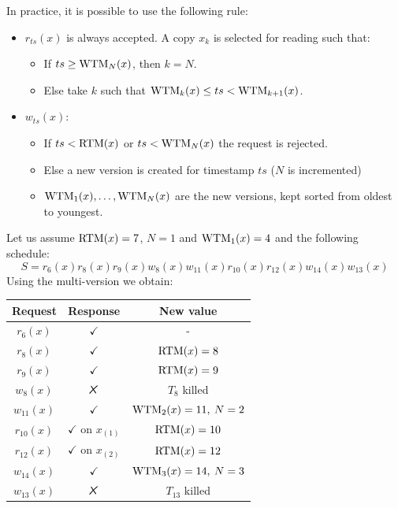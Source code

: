 \documentclass[12pt, a4paper]{report}
\newtheorem[style=M,bodystyle=\normalfont]{theorem}{Theorem}
\newtheorem[style=M,bodystyle=\normalfont]{corollary}{Corollary}
\newtheorem[style=M,bodystyle=\normalfont]{lemma}{Lemma}
\newtheorem[style=M,bodystyle=\normalfont]{definition}{Definition}
\newcommand{\tikzxmark}{%
\tikz[scale=0.23] {
    \draw[line width=0.7,line cap=round] (0,0) to [bend left=6] (1,1);
    \draw[line width=0.7,line cap=round] (0.2,0.95) to [bend right=3] (0.8,0.05);
}}
\begin{document}
    In practice, it is possible to use the following rule: 
    \begin{itemize}
        \item $r_{ts}(x)$ is always accepted. A copy $x_k$ is selected for reading such that:
            \begin{itemize}
                \item If $ts \geq \textnormal{WTM}_N(x)$, then $k=N$. 
                \item Else take $k$ such that $\textnormal{WTM}_k(x) \leq ts < \textnormal{WTM}_{k+1}(x)$. 
            \end{itemize}
        \item $w_{ts}(x)$:
            \begin{itemize}
                \item If $ts < \textnormal{RTM}(x)$ or $ts < \textnormal{WTM}_N(x)$ the request is rejected. 
                \item Else a new version is created for timestamp $ts$ ($N$ is incremented)
                \item $\textnormal{WTM}_1(x), \dots, \textnormal{WTM}_N(x)$ are the new versions, kept sorted from oldest to youngest. 
            \end{itemize}
    \end{itemize}
    \begin{example}
        Let us assume $\textnormal{RTM}(x)=7$, $N=1$ and $\textnormal{WTM}_1(x)=4$ and the following schedule: 
        \[S=r_6(x) r_8(x) r_9(x) w_8(x) w_{11}(x) r_{10}(x) r_{12}(x) w_{14}(x) w_{13}(x)\]
        Using the multi-version we obtain: 
        \begin{table}[H]
            \centering
            \begin{tabular}{ccc}
            \textbf{Request} & \textbf{Response}         & \textbf{New value}  \\ \hline
            $r_6(x)$         & $\checkmark$              & -                   \\
            $r_8(x)$         & $\checkmark$              & $\textnormal{RTM}(x)=8$          \\
            $r_9(x)$         & $\checkmark$              & $\textnormal{RTM}(x)=9$          \\
            $w_8(x)$         & $\tikzxmark$              & $T_8$ killed        \\
            $w_{11}(x)$      & $\checkmark$              & $\textnormal{WTM}_2(x)=11,\:N=2$ \\
            $r_{10}(x)$      & $\checkmark$ on $x_{(1)}$ & $\textnormal{RTM}(x)=10$         \\
            $r_{12}(x)$      & $\checkmark$ on $x_{(2)}$ & $\textnormal{RTM}(x)=12$         \\
            $w_{14}(x)$      & $\checkmark$              & $\textnormal{WTM}_3(x)=14,\:N=3$ \\
            $w_{13}(x)$      & $\tikzxmark$              & $T_{13}$ killed
            \end{tabular}
        \end{table}
    \end{example}
\end{document}
